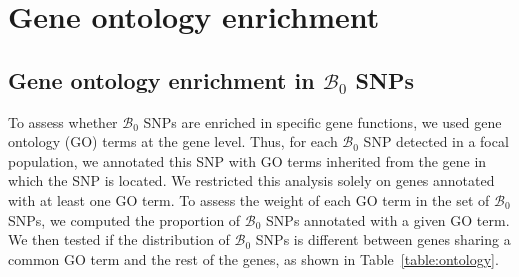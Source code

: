 \documentclass{article}
\newcommand{\SphyBen}{\mathcal{B}_0}
\begin{document}
    \section{Gene ontology enrichment}

    \subsection{Gene ontology enrichment in \texorpdfstring{$\SphyBen$}{B₀} SNPs}

    To assess whether $\SphyBen$ SNPs are enriched in specific gene functions, we used gene ontology (GO) terms at the gene level.
    Thus, for each $\SphyBen$ SNP detected in a focal population, we annotated this SNP with GO terms inherited from the gene in which the SNP is located.
    We restricted this analysis solely on genes annotated with at least one GO term.
    To assess the weight of each GO term in the set of $\SphyBen$ SNPs, we computed the proportion of $\SphyBen$ SNPs annotated with a given GO term.
    We then tested if the distribution of $\SphyBen$ SNPs is different between genes sharing a common GO term and the rest of the genes, as shown in Table~\ref{table:ontology}.
\end{document}
